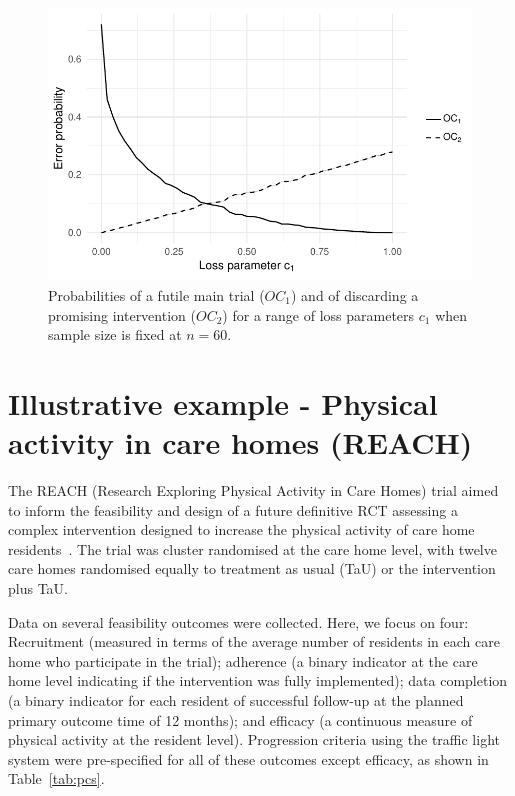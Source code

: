 \documentclass[AMA,STIX1COL]{WileyNJD-v2}
\begin{document}
\begin{figure}
\centering
\includegraphics[scale=0.8]{./Figures/tiga_n60}
\caption{Probabilities of a futile main trial ($OC_1$) and of discarding a promising intervention ($OC_2$) for a range of loss parameters $c_1$ when sample size is fixed at $n=60$.}
\label{fig:tiga_n60}
\end{figure}


\section{Illustrative example - Physical activity in care homes (REACH)}\label{sec:REACH}

The REACH (Research Exploring Physical Activity in Care Homes) trial aimed to inform the feasibility and design of a future definitive RCT assessing a complex intervention designed to increase the physical activity of care home residents~\cite{Forster2017}. The trial was cluster randomised at the care home level, with  twelve care homes randomised equally to treatment as usual (TaU) or the intervention plus TaU.

Data on several feasibility outcomes were collected. Here, we focus on four: Recruitment (measured in terms of the average number of residents in each care home who participate in the trial); adherence (a binary indicator at the care home level indicating if the intervention was fully implemented); data completion (a binary indicator for each resident of successful follow-up at the planned primary outcome time of 12 months); and efficacy (a continuous measure of physical activity at the resident level). Progression criteria using the traffic light system were pre-specified for all of these outcomes except efficacy, as shown in Table~\ref{tab:pcs}.
\end{document}
